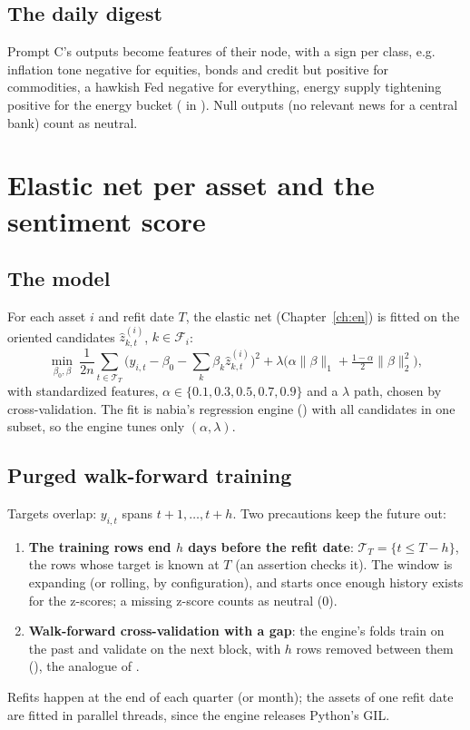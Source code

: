 \section{The daily digest}
Prompt C's outputs become features of their node, with a sign per class, e.g. inflation tone negative for equities,
bonds and credit but positive for commodities, a hawkish Fed negative for everything, energy supply tightening
positive for the energy bucket ( in ). Null outputs (no relevant news for
a central bank) count as neutral.
\begin{codepointers}
\end{codepointers}

\chapter{Elastic net per asset and the sentiment score}\label{ch:rb-model}

\section{The model}
For each asset $i$ and refit date $T$, the elastic net (Chapter~\ref{ch:en}) is fitted on the oriented
candidates $\hat z^{(i)}_{k,t}$, $k\in\mathcal F_i$:
\[
  \min_{\beta_0,\beta}\ \frac1{2n}\sum_{t\in\mathcal T_T}\big(y_{i,t}-\beta_0-\textstyle\sum_k\beta_k\hat z^{(i)}_{k,t}\big)^2
  +\lambda\Big(\alpha\|\beta\|_1+\tfrac{1-\alpha}2\|\beta\|_2^2\Big),
\]
with standardized features, $\alpha\in\{0.1,0.3,0.5,0.7,0.9\}$ and a $\lambda$ path, chosen by cross-validation.
The fit is nabia's regression engine () with all candidates in one subset, so the engine tunes
only $(\alpha,\lambda)$.

\section{Purged walk-forward training}\label{sec:rb-purge}
Targets overlap: $y_{i,t}$ spans $t+1,\dots,t+h$. Two precautions keep the future out:
\begin{enumerate}
  \item \textbf{The training rows end $h$ days before the refit date}: $\mathcal T_T=\{t\le T-h\}$, the rows whose
        target is known at $T$ (an assertion checks it). The window is expanding (or rolling, by configuration),
        and starts once enough history exists for the z-scores; a missing z-score counts as neutral (0).
  \item \textbf{Walk-forward cross-validation with a gap}: the engine's folds train on the past and validate on
        the next block, with $h$ rows removed between them (), the analogue of
        .
\end{enumerate}
Refits happen at the end of each quarter (or month); the assets of one refit date are fitted in parallel threads,
since the engine releases Python's GIL.

